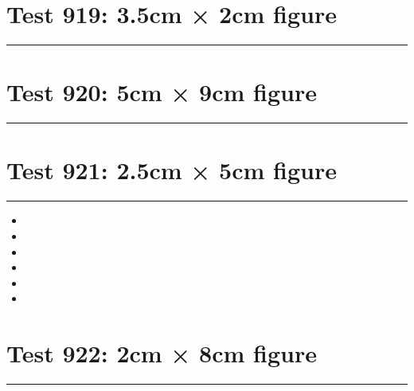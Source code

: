 \documentclass[a4paper,11pt]{article}
\begin{document}
\section*{Test 919: 3.5cm × 2cm figure}
\begin{swarmwrap}%
  \begin{minipage}[t]{3cm}
    \centering
    \rule{\linewidth}{2cm}
  \end{minipage}%
\end{swarmwrap}%
\swarmwrapnext
\lipsum[32]
\lipsum[33]
\lipsum[34]
\lipsum[35]
\section*{Test 920: 5cm × 9cm figure}
\begin{swarmwrap}%
  \begin{minipage}[t]{5cm}
    \centering
    \rule{\linewidth}{9cm}
  \end{minipage}%
\end{swarmwrap}%
\swarmwrapnext
\lipsum[44]
\lipsum[45]
\lipsum[46]
\lipsum[47]
\section*{Test 921: 2.5cm × 5cm figure}
\begin{swarmwrap}%
  \begin{minipage}[t]{2cm}
    \centering
    \rule{\linewidth}{5cm}
  \end{minipage}%
\end{swarmwrap}%
\swarmwrapnext
\lipsum[11]
\begin{itemize}
  \item \lipsum[12][1-3]
  \item \lipsum[13][1-3]
  \item \lipsum[14][1-3]
  \item \lipsum[15][1-3]
  \item \lipsum[16][1-3]
  \item \lipsum[17][1-3]
\end{itemize}
\section*{Test 922: 2cm × 8cm figure}
\begin{swarmwrap}%
  \begin{minipage}[t]{2cm}
    \centering
    \rule{\linewidth}{8cm}
  \end{minipage}%
\end{swarmwrap}%
\swarmwrapnext
\lipsum[39]
\lipsum[40]
\lipsum[41]
\lipsum[42]
\end{document}

